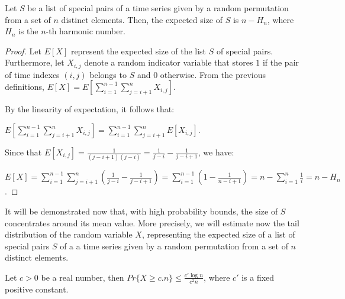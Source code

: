 \documentclass[12pt,letterpaper]{article}
\begin{document}
\begin{proposition}
Let $S$ be a list of special pairs of a time series given by a random permutation from a set 
of $n$ distinct elements. Then, the expected size of $S$ is $n - H_n$, where $H_n$ is the $n$-th harmonic number.
\end{proposition}
\begin{proof}
Let $E[X]$ represent the expected size of the list $S$ of special pairs.
Furthermore, let $X_{i,j}$ denote a random indicator variable
that stores $1$ if the pair of time indexes $(i,j)$ belongs to $S$ and $0$ otherwise.
From the previous definitions, $E[X] = E[\sum\limits_{i=1}^{n-1} \sum\limits_{j=i+1}^{n}X_{i,j}]$.

By the linearity of expectation, it follows that:

$E[\sum\limits_{i=1}^{n-1} \sum\limits_{j=i+1}^{n} X_{i,j}] = \sum\limits_{i=1}^{n-1} \sum\limits_{j=i+1}^{n} E[X_{i,j}]$.

Since that $E[X_{i,j}] = \frac{1}{(j-i+1)(j-i)} = \frac{1}{j-i} - \frac{1}{j-i+1}$, we have:

$E[X] = \sum\limits_{i=1}^{n-1} \sum\limits_{j=i+1}^{n}
(\frac{1}{j-i} - \frac{1}{j-i+1})
= \sum\limits_{i=1}^{n-1} (1 - \frac{1}{n-i+1})
= n - \sum\limits_{i=1}^{n} \frac{1}{i}  =  n - H_n$.
\end{proof}


\noindent It will be demonstrated now that, with high probability bounds,
the size of $S$ concentrates around its mean value. More precisely, we will estimate now the tail distribution of the random variable $X$,
representing the expected size of a list of special pairs $S$ of a
a time series given by a random permutation from a set 
of $n$ distinct elements.



\begin{proposition}
Let $c > 0$ be a real number, then $Pr\{X \geq c .n \} \leq \frac{c' \log n}{c^2 n}$,
where $c'$ is a fixed positive constant.
\end{proposition}
\end{document}
